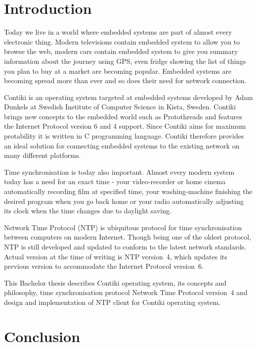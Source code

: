 
\chapter{Introduction}
Today we live in a world where embedded systems are part of almost every electronic thing. Modern televisions
contain embedded system to allow you to browse the web, modern cars contain embedded system to give you summary information
about the journey using GPS, even fridge showing the list of things you plan to buy at a market are becoming popular.
Embedded systems are becoming spread more than ever and so does
their need for network connection.

Contiki is an operating system targeted at embedded systems
developed by Adam Dunkels at Swedish Institute of Computer Science in Kista, Sweden.
Contiki brings new concepts to the embedded world such as Protothreads and features
the Internet Protocol version 6 and 4 support.
Since Contiki aims for maximum protability it is written in C programming language.
Contiki therefore provides an ideal solution for connecting
embedded systems to the existing network on many different platforms.

Time synchronisation is today also important.
Almost every modern system today has a need for an exact time -
your video-recorder or home cinema automatically recording film at specified time, your washing-machine finishing the
desired program when you go back home or your radio automatically adjusting its clock when the time changes
due to daylight saving.

Network Time Protocol (NTP) is ubiquitous protocol for time synchronisation between computers on modern Internet.
Though being one of the oldest protocol, NTP is still developed and updated to conform to the latest
network standards. Actual version at the time of writing is NTP version~4, which updates its previous version to
accommodate the Internet Protocol version~6.

This Bachelor thesis describes Contiki operating system, its concepts and philosophy, time synchronisation protocol
Network Time Protocol version~4 and design and implementation of NTP client for Contiki operating system.








\chapter{Conclusion}
